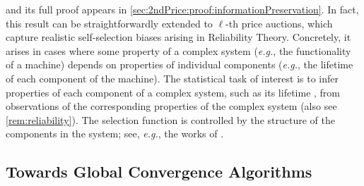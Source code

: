 \documentclass[11pt,letterpaper]{article}
\theoremstyle{plain}
\theoremstyle{definition}
\theoremstyle{remark}
\newcommand{\eg}{\emph{e.g.}}
\begin{document}
and its full proof appears in \cref{sec:2ndPrice:proof:informationPreservation}.
In fact, this result can be straightforwardly extended to $\ell$-th price auctions,
which capture realistic self-selection biases arising in Reliability Theory.
Concretely, it arises in cases where some property of a complex system (\eg{}, the functionality of a machine) depends on properties of individual components (\eg{}, the lifetime of each component of the machine). The statistical task of interest is to infer properties of each component of a complex system, 
such as its lifetime \cite{meilijson1981autopsy}, 
from observations of the corresponding properties of the complex system (also see \cref{rem:reliability}). The selection function is controlled by the structure of the components in the system; see, \eg{}, 
the works of \citet{gertsbakh1988statistical,huang2019reliability}.








 








 \subsection{Towards Global Convergence Algorithms}
\label{sec:apps-2}
\end{document}
